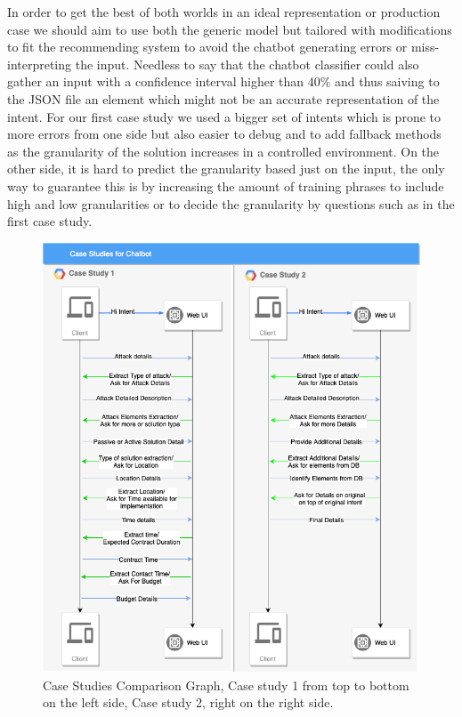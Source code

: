 In order to get the best of both worlds in an ideal representation or production case we should aim to use both the generic model but tailored with modifications to fit the recommending system to avoid the chatbot generating errors or miss-interpreting the input. Needless to say that the chatbot classifier could also gather an input with a confidence interval higher than 40\% and thus saiving to the JSON file an element which might not be an accurate representation of the intent. For our first case study we used a bigger set of intents which is prone to more errors from one side but also easier to debug and to add fallback methods as the granularity of the solution increases in a controlled environment. On the other side, it is hard to predict the granularity based just on the input, the only way to guarantee this is by increasing the amount of training phrases to include high and low granularities or to decide the granularity by questions such as in the first case study.

\begin{figure}
    \centering
    \includegraphics[scale=0.53]{MA-BA-Thesis/CaseStudies.png}
    \caption{Case Studies Comparison Graph, Case study 1 from top to bottom on the left side, Case study 2, right on the right side.}
    \label{fig:case_studies_comparison}
\end{figure}{}


